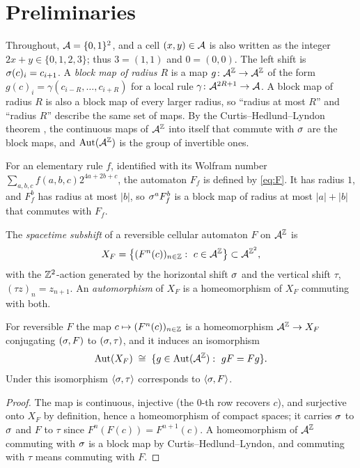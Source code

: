 \section{Preliminaries}\label{sec:prelim}

Throughout, $\mathcal{A}=\{0,1\}^2$, and a cell $(x,y)\in\mathcal{A}$ is also written as the integer $2x+y\in\{0,1,2,3\}$; thus $3=(1,1)$ and $0=(0,0)$. The left shift is $\sigma(c)_i=c_{i+1}$. A \emph{block map of radius $R$} is a map $g\colon\mathcal{A}^{\mathbb{Z}}\to\mathcal{A}^{\mathbb{Z}}$ of the form $g(c)_i=\gamma(c_{i-R},\dots,c_{i+R})$ for a local rule $\gamma\colon\mathcal{A}^{2R+1}\to\mathcal{A}$. A block map of radius $R$ is also a block map of every larger radius, so ``radius at most $R$'' and ``radius $R$'' describe the same set of maps. By the Curtis--Hedlund--Lyndon theorem \cite{Hedlund1969}, the continuous maps of $\mathcal{A}^{\mathbb{Z}}$ into itself that commute with $\sigma$ are the block maps, and $\operatorname{Aut}(\mathcal{A}^{\mathbb{Z}})$ is the group of invertible ones.

For an elementary rule $f$, identified with its Wolfram number $\sum_{a,b,c}f(a,b,c)2^{4a+2b+c}$, the automaton $F_f$ is defined by \eqref{eq:F}. It has radius $1$, and $F_f^b$ has radius at most $|b|$, so $\sigma^aF_f^b$ is a block map of radius at most $|a|+|b|$ that commutes with $F_f$.

\begin{definition}
The \emph{spacetime subshift} of a reversible cellular automaton $F$ on $\mathcal{A}^{\mathbb{Z}}$ is
\[
X_F=\bigl\{(F^n(c))_{n\in\Z}:\ c\in\A^{\Z}\bigr\}\subset\A^{\Z^2},
\]
with the $\mathbb{Z}^2$-action generated by the horizontal shift $\sigma$ and the vertical shift $\tau$, $(\tau z)_{n}=z_{n+1}$. An \emph{automorphism} of $X_F$ is a homeomorphism of $X_F$ commuting with both.
\end{definition}

\begin{lemma}\label{lem:spacetime}
For reversible $F$ the map $c\mapsto(F^n(c))_{n\in\mathbb{Z}}$ is a homeomorphism $\mathcal{A}^{\mathbb{Z}}\to X_F$ conjugating $(\sigma,F)$ to $(\sigma,\tau)$, and it induces an isomorphism
\[
\Aut(X_F)\;\cong\;\{g\in\Aut(\A^{\Z}):\ gF=Fg\}.
\]
Under this isomorphism $\langle\sigma,\tau\rangle$ corresponds to $\langle\sigma,F\rangle$.
\end{lemma}

\begin{proof}
The map is continuous, injective (the $0$-th row recovers $c$), and surjective onto $X_F$ by definition, hence a homeomorphism of compact spaces; it carries $\sigma$ to $\sigma$ and $F$ to $\tau$ since $F^{n}(F(c))=F^{n+1}(c)$. A homeomorphism of $\mathcal{A}^{\mathbb{Z}}$ commuting with $\sigma$ is a block map by Curtis--Hedlund--Lyndon, and commuting with $\tau$ means commuting with $F$.
\end{proof}

